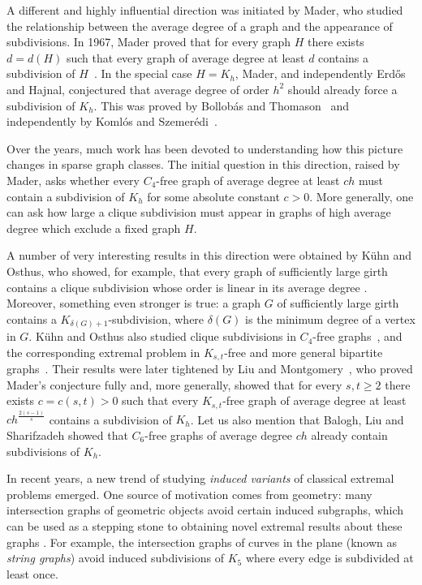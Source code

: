 \documentclass[10pt, a4paper]{article}
\numberwithin{theorem}{section} %
\theoremstyle{remark}
\theoremstyle{definition}
\begin{document}
A different and highly influential direction was initiated by Mader, who studied the relationship between the average degree of a graph and the appearance of subdivisions. In 1967, Mader proved that for every graph $H$ there exists $d=d(H)$ such that every graph of average degree at least $d$ contains a subdivision of $H$~\cite{Mader67}. In the special case $H=K_h$, Mader, and independently Erd\H{o}s and Hajnal, conjectured that average degree of order $h^2$ should already force a subdivision of $K_h$. This was proved by Bollob\'as and Thomason~\cite{BollobasThomason98} and independently by Koml\'os and Szemer\'edi~\cite{KomlosSzemeredi96}. 

Over the years, much work has been devoted to understanding how this picture changes in sparse graph classes. The initial question in this direction, raised by Mader, asks whether every $C_4$-free graph of average degree at least $ch$ must contain a subdivision of $K_h$ for some absolute constant $c>0$. More generally, one can ask how large a clique subdivision must appear in graphs of high average degree which exclude a fixed graph $H$. 

A number of very interesting results in this direction were obtained by K\"uhn and Osthus, who showed, for example, that every graph of sufficiently large girth contains a clique subdivision whose order is linear in its average degree \cite{KuhnOsthus02, KuhnOsthus06Girth}. Moreover, something even stronger is true: a graph $G$ of sufficiently large girth contains a $K_{\delta(G)+1}$-subdivision, where $\delta(G)$ is the minimum degree of a vertex in $G$.  K\"uhn and Osthus also studied clique subdivisions in $C_4$-free graphs~\cite{KuhnOsthus04C4}, and the corresponding extremal problem in $K_{s,t}$-free and more general bipartite graphs~\cite{KuhnOsthus06Bip}. Their results were later tightened by Liu and Montgomery~\cite{LiuMontgomery17}, who proved Mader's conjecture fully and, more generally, showed that for every $s,t\ge 2$ there exists $c=c(s,t)>0$ such that every $K_{s,t}$-free graph of average degree at least $c h^{\frac{2(s-1)}{s}}$ contains a subdivision of $K_h$. Let us also mention that Balogh, Liu and Sharifzadeh \cite{BLS14} showed that $C_6$-free graphs of average degree $ch$ already contain subdivisions of $K_h$.

In recent years, a new trend of studying \textit{induced variants} of classical extremal problems emerged. One source of motivation comes from geometry: many intersection graphs of geometric objects avoid certain induced subgraphs, which can be used as a stepping stone to obtaining novel extremal results about these graphs \cite{HMST25}. For example, the intersection graphs of curves in the plane (known as \textit{string graphs}) avoid induced subdivisions of $K_5$ where every edge is subdivided at least once. 
\end{document}
